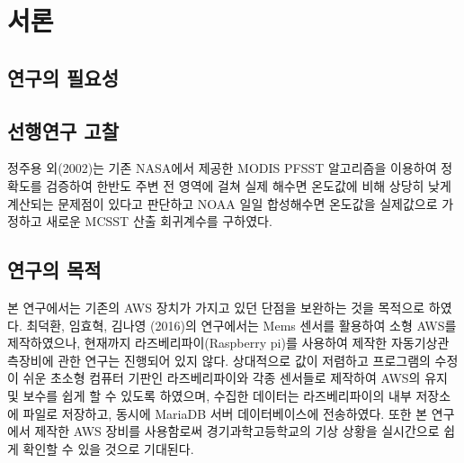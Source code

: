 \section{서론}

\subsection{연구의 필요성}

\subsection{선행연구 고찰}
정주용 외(2002)는 기존 NASA에서 제공한 MODIS PFSST 알고리즘을 이용하여 정확도를 검증하여 한반도 주변 전 영역에 걸쳐 실제 해수면 온도값에 비해 상당히 낮게 계산되는 문제점이 있다고 판단하고 NOAA 일일 합성해수면 온도값을 실제값으로 가정하고 새로운 MCSST 산출 회귀계수를 구하였다\cite{Modis2020}.

\subsection{연구의 목적}
본 연구에서는 기존의 AWS 장치가 가지고 있던 단점을 보완하는 것을 목적으로 하였다. 최덕환, 임효혁, 김나영 (2016)의 연구에서는 Mems 센서를 활용하여 소형 AWS를 제작하였으나, 현재까지 라즈베리파이(Raspberry pi)를 사용하여 제작한 자동기상관측장비에 관한 연구는 진행되어 있지 않다.\cite{Ref1} 상대적으로 값이 저렴하고 프로그램의 수정이 쉬운 초소형 컴퓨터 기판인 라즈베리파이와 각종 센서들로 제작하여 AWS의 유지 및 보수를 쉽게 할 수 있도록 하였으며, 수집한 데이터는 라즈베리파이의 내부 저장소에 파일로 저장하고, 동시에 MariaDB 서버 데이터베이스에 전송하였다. 또한 본 연구에서 제작한 AWS 장비를 사용함로써 경기과학고등학교의 기상 상황을 실시간으로 쉽게 확인할 수 있을 것으로 기대된다.